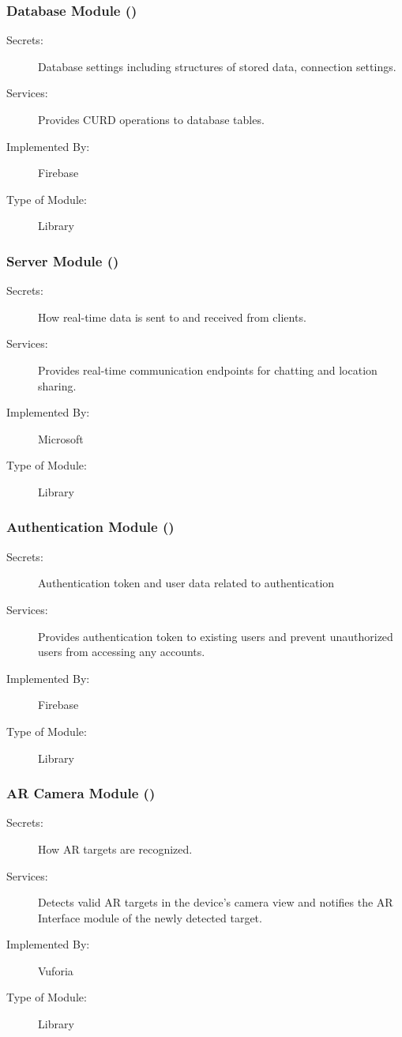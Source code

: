 \documentclass[12pt, titlepage]{article}
\begin{document}
  \subsubsection{Database Module (\label{mDB})}
  \begin{description}
  \item[Secrets:]Database settings including structures of stored data, connection settings.
  \item[Services:]Provides CURD operations to database tables.
  \item[Implemented By:] Firebase
  \item[Type of Module:] Library
  \end{description}
  
  \subsubsection{Server Module (\label{mServer})}
  \begin{description}
  \item[Secrets:]How real-time data is sent to and received from clients.
  \item[Services:]Provides real-time communication endpoints for chatting and location sharing.
  \item[Implemented By:] Microsoft
  \item[Type of Module:] Library
  \end{description}
  
  \subsubsection{Authentication Module (\label{mAuth})}
  \begin{description}
  \item[Secrets:]Authentication token and user data related to authentication
  \item[Services:]Provides authentication token to existing users and prevent unauthorized users from accessing any accounts.
  \item[Implemented By:] Firebase
  \item[Type of Module:] Library
  \end{description}
  
  \subsubsection{AR Camera Module (\label{mARCamera})}
  \begin{description}
  \item[Secrets:]How AR targets are recognized.
  \item[Services:]Detects valid AR targets in the device's camera view and notifies the AR Interface module of the newly detected target.
  \item[Implemented By:] Vuforia
  \item[Type of Module:] Library
  \end{description}
  
\end{document}
